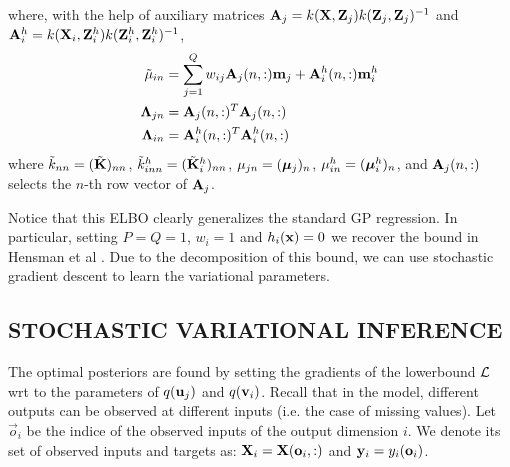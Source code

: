 where, with the help of auxiliary matrices $\mathbf{A}_j = k(\mathbf{X},\mathbf{Z}_j)k(\mathbf{Z}_j,\mathbf{Z}_j)^{-1}$ and  $\mathbf{A}^h_i = k(\mathbf{X}_i,\mathbf{Z}^h_i)k(\mathbf{Z}^h_i,\mathbf{Z}^h_i)^{-1}$, 
\begin{align}
\tilde{\mu}_{in}
&= \sum_{j=1}^Q w_{ij} \mathbf{A}_j(n,:) \mathbf{m}_j + \mathbf{A}^h_i(n,:) \mathbf{m}^h_i \\
\mathbf{\Lambda}_{jn}
&= \mathbf{A}_j(n,:)^T \mathbf{A}_j(n,:)  \\
\mathbf{\Lambda}_{in}
&= \mathbf{A}^h_i(n,:)^T \mathbf{A}^h_i(n,:) 
\end{align}
where $\tilde{k}_{nn} = (\tilde{\mathbf{K}})_{nn}$, $\tilde{k}^h_{inn} = (\tilde{\mathbf{K}}^h_i)_{nn}$, $\mu_{jn} = (\boldsymbol{\mu}_j)_n$,  $\mu^h_{in} = (\boldsymbol{\mu}^h_i)_n$, and $\mathbf{A}_j(n,:)$ selects the $n$-th row vector of $\mathbf{A}_j$.

\noindent Notice that this ELBO clearly generalizes the standard GP regression. In particular, setting $P = Q = 1$, $w_i = 1$ and $h_i(\mathbf{x}) = 0$ we recover the bound in Hensman et al \citet{hensmangaussian}.
Due to the decomposition of this bound, we can use stochastic gradient descent to learn the variational parameters.

\subsection{STOCHASTIC VARIATIONAL INFERENCE}
\newcommand{\oi}{\vec{o}_i}

The optimal posteriors are found by setting the gradients of the lowerbound $\mathcal{L}$ wrt to the parameters of $q(\mathbf{u}_j)$ and $q(\mathbf{v}_i)$.
Recall that in the model, different outputs can be observed at different inputs (i.e. the case of missing values).
Let $\oi$ be the indice of the observed inputs of the output dimension $i$.
We denote its set of observed inputs and targets as: $\X_i = \X(\oi,:)$ and $\y_i = y_{i}(\oi)$.


